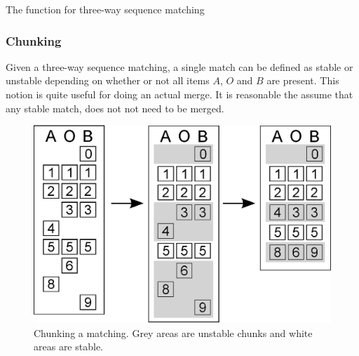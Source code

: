 \documentclass[11pt]{article}
\begin{document}

\begin{algorithm}
\caption{The function for three-way sequence matching}
  \label{ThreeWayMatchingAlgorithm}
\end{algorithm}

\subsubsection{Chunking}
Given a three-way sequence matching, a single match can be defined as stable or unstable depending on whether or not all items $A$, $O$ and $B$ are present. This notion is quite useful for doing an actual merge. It is reasonable the assume that any stable match, does not not need to be merged.

\begin{figure}
   \centerline{\includegraphics[scale=0.4]{drawings/eps/threewaymatching-chunking.eps}}
   \caption{Chunking a matching. Grey areas are unstable chunks and white areas are stable.}
   \label{Chunking}
\end{figure}
\end{document}
